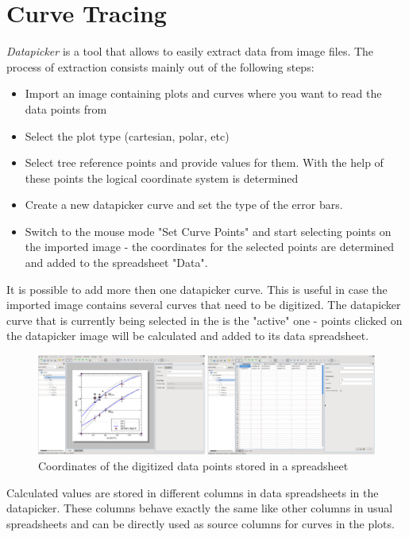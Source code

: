 \section{Curve Tracing}\label{sec:curve_tracing}
\textit{Datapicker} is a tool that allows to easily extract data from image files. The process of extraction consists mainly out of the following steps:
\begin{itemize}
\item Import an image containing plots and curves where you want to read the data points from
\item Select the plot type (cartesian, polar, etc)
\item Select tree reference points and provide values for them. With the help of these points the logical coordinate system is determined
\item Create a new datapicker curve and set the type of the error bars.
\item Switch to the mouse mode "Set Curve Points" and start selecting points on the imported image - the coordinates for the selected points are determined and added to the spreadsheet "Data".
\end{itemize}

It is possible to add more then one datapicker curve. This is useful in case the imported image contains several curves that need to be digitized.
The datapicker curve that is currently being selected in the  is the "active" one - points clicked on the datapicker image will be calculated and added to its data spreadsheet.
\begin{figure}
\includegraphics[width=\textwidth]{images/datapicker_active_curve_data_spreadsheet.png}
\caption{Coordinates of the digitized data points stored in a spreadsheet}
\end{figure}

Calculated values are stored in different columns in data spreadsheets in the datapicker. These columns behave exactly the same like other columns
in usual spreadsheets and can be directly used as source columns for curves in the plots.

